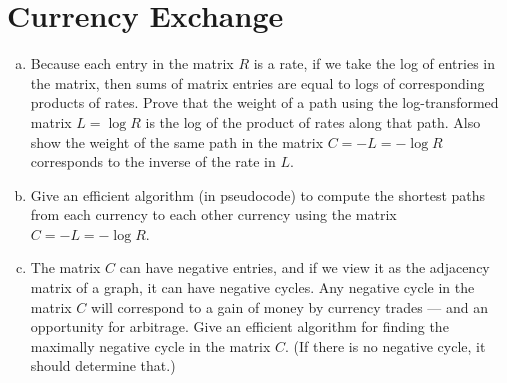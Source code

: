 \documentclass[12pt]{article}
\begin{document}
\section{Currency Exchange}\label{currency exchange}
\begin{enumerate}[(a)]
\item Because each entry in the matrix $R$ is a rate, if we take the log of entries in the matrix, then sums of matrix entries are equal to logs of corresponding products of rates. Prove that the weight of a path using the log-transformed matrix $L = \log R$ is the log of the product of rates along that path. Also show the weight of the same path in the matrix $C = −L = − \log R$ corresponds to the inverse of the rate in $L$.
\begin{addmargin}[2em]{2em}

\end{addmargin}
\item Give an efficient algorithm (in pseudocode) to compute the shortest paths from each currency to each other currency using the matrix $C = −L = − \log R$.
\begin{addmargin}[2em]{2em}

\end{addmargin}
\item The matrix $C$ can have negative entries, and if we view it as the adjacency matrix of a graph, it can have negative cycles. Any negative cycle in the matrix $C$ will correspond to a gain of money by currency trades — and an opportunity for arbitrage. Give an efficient algorithm for finding the maximally negative cycle in the matrix $C$. (If there is no negative cycle, it should determine that.)
\begin{addmargin}[2em]{2em}

\end{addmargin}
\end{enumerate}
\end{document}
